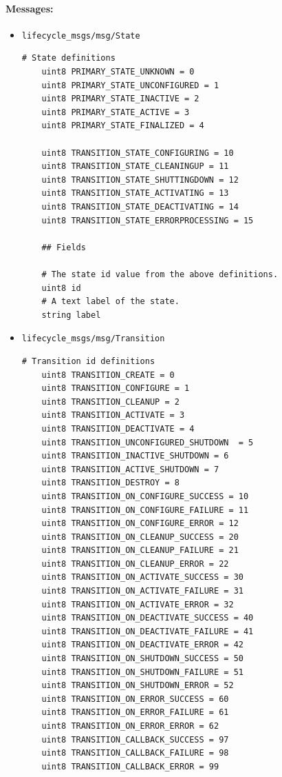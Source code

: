 \paragraph{Messages:} 
\begin{itemize}
	\item \lstinline{lifecycle_msgs/msg/State}
\begin{lstlisting}[language=msg,
	caption={Message definition State}]
	# State definitions
	uint8 PRIMARY_STATE_UNKNOWN = 0
	uint8 PRIMARY_STATE_UNCONFIGURED = 1
	uint8 PRIMARY_STATE_INACTIVE = 2
	uint8 PRIMARY_STATE_ACTIVE = 3
	uint8 PRIMARY_STATE_FINALIZED = 4

	uint8 TRANSITION_STATE_CONFIGURING = 10
	uint8 TRANSITION_STATE_CLEANINGUP = 11
	uint8 TRANSITION_STATE_SHUTTINGDOWN = 12
	uint8 TRANSITION_STATE_ACTIVATING = 13
	uint8 TRANSITION_STATE_DEACTIVATING = 14
	uint8 TRANSITION_STATE_ERRORPROCESSING = 15

	## Fields

	# The state id value from the above definitions.
	uint8 id
	# A text label of the state.
	string label
\end{lstlisting}

\item \lstinline{lifecycle_msgs/msg/Transition}
\begin{lstlisting}[language=msg,
	caption={Message definition Transition}]
	# Transition id definitions
	uint8 TRANSITION_CREATE = 0
	uint8 TRANSITION_CONFIGURE = 1
	uint8 TRANSITION_CLEANUP = 2
	uint8 TRANSITION_ACTIVATE = 3
	uint8 TRANSITION_DEACTIVATE = 4
	uint8 TRANSITION_UNCONFIGURED_SHUTDOWN  = 5
	uint8 TRANSITION_INACTIVE_SHUTDOWN = 6
	uint8 TRANSITION_ACTIVE_SHUTDOWN = 7
	uint8 TRANSITION_DESTROY = 8
	uint8 TRANSITION_ON_CONFIGURE_SUCCESS = 10
	uint8 TRANSITION_ON_CONFIGURE_FAILURE = 11
	uint8 TRANSITION_ON_CONFIGURE_ERROR = 12
	uint8 TRANSITION_ON_CLEANUP_SUCCESS = 20
	uint8 TRANSITION_ON_CLEANUP_FAILURE = 21
	uint8 TRANSITION_ON_CLEANUP_ERROR = 22
	uint8 TRANSITION_ON_ACTIVATE_SUCCESS = 30
	uint8 TRANSITION_ON_ACTIVATE_FAILURE = 31
	uint8 TRANSITION_ON_ACTIVATE_ERROR = 32
	uint8 TRANSITION_ON_DEACTIVATE_SUCCESS = 40
	uint8 TRANSITION_ON_DEACTIVATE_FAILURE = 41
	uint8 TRANSITION_ON_DEACTIVATE_ERROR = 42
	uint8 TRANSITION_ON_SHUTDOWN_SUCCESS = 50
	uint8 TRANSITION_ON_SHUTDOWN_FAILURE = 51
	uint8 TRANSITION_ON_SHUTDOWN_ERROR = 52
	uint8 TRANSITION_ON_ERROR_SUCCESS = 60
	uint8 TRANSITION_ON_ERROR_FAILURE = 61
	uint8 TRANSITION_ON_ERROR_ERROR = 62
	uint8 TRANSITION_CALLBACK_SUCCESS = 97
	uint8 TRANSITION_CALLBACK_FAILURE = 98
	uint8 TRANSITION_CALLBACK_ERROR = 99
	

\end{lstlisting}
\end{itemize}
